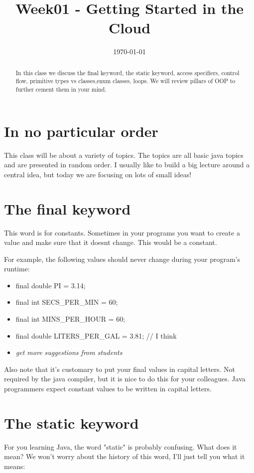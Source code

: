 \documentclass[12pt,a4paper]{article}
\begin{document}
%
\title{\textbf{Week01 - Getting Started in the Cloud}}
\date{\today}
%
\maketitle

\begin{abstract}
In this class we discuss the final keyword, the static keyword, access
specifiers, control flow, primitive types vs classes,enum classes, loops.  We
will review pillars of OOP to further cement them in your mind.
\end{abstract}

\section{In no particular order}
This class will be about a variety of topics. The topics are all basic java
topics and are presented in random order. I usually like to build a big lecture
around a central idea, but today we are focusing on lots of small ideas!

\section{The final keyword}
This word is for constants. Sometimes in your programs you want to create a
value and make sure that it doesnt change. This would be a constant.

For example, the following values should never change during your program's
runtime:

\begin{itemize}
\item final double PI = 3.14;
\item final int SECS\_PER\_MIN = 60;
\item final int MINS\_PER\_HOUR = 60;
\item final double LITERS\_PER\_GAL = 3.81; // I think
\item \textit{get more suggestions from students}
\end{itemize}

Also note that it's customary to put your final values in capital letters. Not
required by the java compiler, but it is nice to do this for your colleagues.
Java programmers expect constant values to be written in capital letters.

\section{The static keyword}
For you learning Java, the word "static" is probably confusing. What does it
mean? We won't worry about the history of this word, I'll just tell you what it
means:
\end{document}
